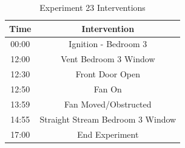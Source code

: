 \documentclass{article}
\begin{document}
\begin{table}[H]
	\centering
	\caption{Experiment 23 Interventions}
	\begin{tabular}{|c|c|} 
		\hline
		Time & Intervention \\ \hline \hline
		00:00 & Ignition - Bedroom 3 \\ \hline
		12:00 & Vent Bedroom 3 Window \\ \hline
		12:30 & Front Door Open \\ \hline
		12:50 & Fan On \\ \hline
		13:59 & Fan Moved/Obstructed \\ \hline
		14:55 & Straight Stream Bedroom 3 Window \\ \hline
		17:00 & End Experiment \\ \hline
	\end{tabular}
	\label{Table:Exp23Interventions}
\end{table}
\end{document}
